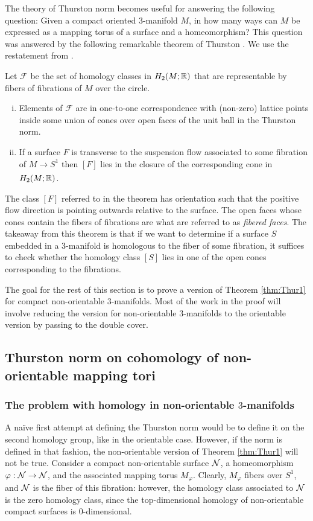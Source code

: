 The theory of Thurston norm becomes useful for answering the following question: Given a compact oriented $3$-manifold $M$, in how many ways can $M$ be expressed as a mapping torus of a surface and a homeomorphism?
This question was answered by the following remarkable theorem of Thurston \cite{thurston1986norm}.
We use the restatement from \cite{yazdi2018pseudo}.
\begin{thm}[Thurston]
  \label{thm:Thur1}
  Let $\mathcal{F}$ be the set of homology classes in $H_2(M; \mathbb{R})$ that are representable by fibers of fibrations of $M$ over the circle.
\begin{enumerate}[(i)]
\item Elements of $\mathcal{F}$ are in one-to-one correspondence with (non-zero) lattice points inside some union of cones over open faces of the unit ball in the Thurston norm.
\item If a surface $F$ is transverse to the suspension flow associated to some fibration of
  $M \xrightarrow[]{} S^1$ then $[F]$ lies in the closure of the corresponding cone in $H_2(M;\mathbb{R})$.
\end{enumerate}
\end{thm}
The class $[F]$ referred to in the theorem has orientation such that the positive flow direction is pointing outwards relative to the surface.
The open faces whose cones contain the fibers of fibrations are what are referred to as \emph{fibered faces}.
The takeaway from this theorem is that if we want to determine if a surface $S$ embedded in a $3$-manifold is homologous to the fiber of some fibration, it suffices to check whether the homology class $[S]$ lies in one of the open cones corresponding to the fibrations.

The goal for the rest of this section is to prove a version of Theorem \ref{thm:Thur1} for compact non-orientable $3$-manifolds.
Most of the work in the proof will involve reducing the version for non-orientable $3$-manifolds to the orientable version by passing to the double cover.

\subsection{Thurston norm on cohomology of non-orientable mapping tori}
\label{sec:thurst-norm-cohom}

\subsubsection*{The problem with homology in non-orientable $3$-manifolds}
A na\"ive first attempt at defining the Thurston norm would be to define it on the second homology group, like in the orientable case.
However, if the norm is defined in that fashion, the non-orientable version of Theorem \ref{thm:Thur1} will not be true.
Consider a compact non-orientable surface $\mathcal{N}$, a homeomorphism $\varphi: \mathcal{N} \to \mathcal{N}$, and the associated mapping torus $M_{\varphi}$.
Clearly, $M_{\varphi}$ fibers over $S^1$, and $\mathcal{N}$ is the fiber of this fibration: however, the homology class associated to $\mathcal{N}$ is the zero homology class, since the top-dimensional homology of non-orientable compact surfaces is $0$-dimensional.

